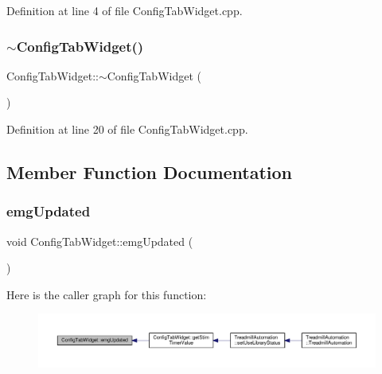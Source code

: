Definition at line 4 of file Config\+Tab\+Widget.\+cpp.

\mbox{\label{class_config_tab_widget_a5288632cb0a8bcb0ce0203576d625034}} 
\subsubsection{\texorpdfstring{$\sim$\+Config\+Tab\+Widget()}{~ConfigTabWidget()}}
{\footnotesize\ttfamily Config\+Tab\+Widget\+::$\sim$\+Config\+Tab\+Widget (\begin{DoxyParamCaption}{ }\end{DoxyParamCaption})}



Definition at line 20 of file Config\+Tab\+Widget.\+cpp.



\subsection{Member Function Documentation}
\mbox{\label{class_config_tab_widget_a94e2bd6114c6d5995b46e3a1ac6accc2}} 
\subsubsection{\texorpdfstring{emg\+Updated}{emgUpdated}}
{\footnotesize\ttfamily void Config\+Tab\+Widget\+::emg\+Updated (\begin{DoxyParamCaption}{ }\end{DoxyParamCaption})\hspace{0.3cm}{\ttfamily [signal]}}

Here is the caller graph for this function\+:
\nopagebreak
\begin{figure}[H]
\begin{center}
\leavevmode
\includegraphics[width=350pt]{class_config_tab_widget_a94e2bd6114c6d5995b46e3a1ac6accc2_icgraph}
\end{center}
\end{figure}
\mbox{\label{class_config_tab_widget_aca7e549d4ae9cc7de010fc6ffd7e9265}} 

